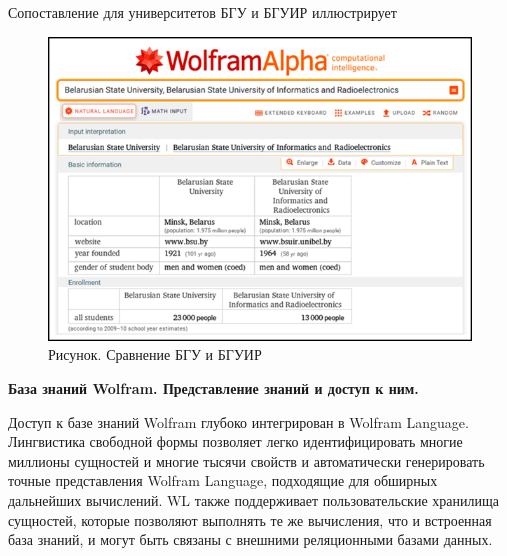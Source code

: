 Сопоставление для университетов БГУ и БГУИР иллюстрирует  \textit{}
\begin{figure}[H]
	\centering
	\includegraphics[scale=0.86]{images/part7/chapter_integration/integr_alg3.png}
	\caption{Рисунок. Сравнение БГУ и БГУИР}
	\label{fig:integr_alg3}
\end{figure}

\textbf{База знаний Wolfram. Представление знаний и доступ к ним.}

Доступ к базе знаний Wolfram глубоко интегрирован в Wolfram Language. Лингвистика свободной формы позволяет легко идентифицировать многие миллионы сущностей и многие тысячи свойств и автоматически генерировать точные представления Wolfram Language, подходящие для обширных дальнейших вычислений. WL также поддерживает пользовательские хранилища сущностей, которые позволяют выполнять те же вычисления, что и встроенная база знаний, и могут быть связаны с внешними реляционными базами данных. 

